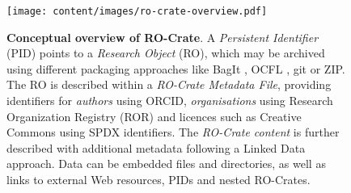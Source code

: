 \begin{figure}[t!]
    \centering
    \texttt{[image: content/images/ro-crate-overview.pdf]}
\caption{\textbf{Conceptual overview of RO-Crate}. A \emph{Persistent Identifier} (PID) \cite{doi:10.1371/journal.pbio.2001414} points to a \emph{Research Object} (RO), which may be archived using different packaging approaches like BagIt \cite{doi:10.17487/rfc8493}, OCFL \cite{ocfl_2020}, git or ZIP. The RO is described within a \emph{RO-Crate Metadata File}, providing identifiers for \emph{authors} using ORCID, \emph{organisations} using Research Organization Registry (ROR) \cite{doi:10.6087/kcse.192} and licences such as Creative Commons using SPDX identifiers. The \emph{RO-Crate content} is further described with additional metadata following a Linked Data approach. Data can be embedded files and directories, as well as links to external Web resources, PIDs and nested RO-Crates.}
    \label{fig:conceptual}
\end{figure}
